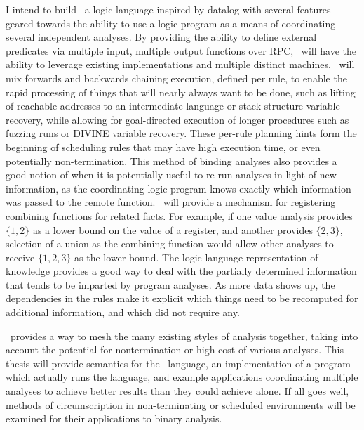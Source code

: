 I intend to build \sysname\, a logic language inspired by datalog with several features geared towards the ability to use a logic program as a means of coordinating several independent analyses.
By providing the ability to define external predicates via multiple input, multiple output functions over RPC, \sysname\ will have the ability to leverage existing implementations and multiple distinct machines.
\sysname\ will mix forwards and backwards chaining execution, defined per rule, to enable the rapid processing of things that will nearly always want to be done, such as lifting of reachable addresses to an intermediate language or stack-structure variable recovery, while allowing for goal-directed execution of longer procedures such as fuzzing runs or DIVINE variable recovery.
These per-rule planning hints form the beginning of scheduling rules that may have high execution time, or even potentially non-termination.
This method of binding analyses also provides a good notion of when it is potentially useful to re-run analyses in light of new information, as the coordinating logic program knows exactly which information was passed to the remote function.
\sysname\ will provide a mechanism for registering combining functions for related facts.
For example, if one value analysis provides $\{1, 2\}$ as a lower bound on the value of a register, and another provides $\{2, 3\}$, selection of a union as the combining function would allow other analyses to receive $\{1, 2, 3\}$ as the lower bound.
The logic language representation of knowledge provides a good way to deal with the partially determined information that tends to be imparted by program analyses. As more data shows up, the dependencies in the rules make it explicit which things need to be recomputed for additional information, and which did not require any.

\sysname\ provides a way to mesh the many existing styles of analysis together, taking into account the potential for nontermination or high cost of various analyses. This thesis will provide semantics for the \sysname\ language, an implementation of a program which actually runs the language, and example applications coordinating multiple analyses to achieve better results than they could achieve alone. If all goes well, methods of circumscription in non-terminating or scheduled environments will be examined for their applications to binary analysis.

